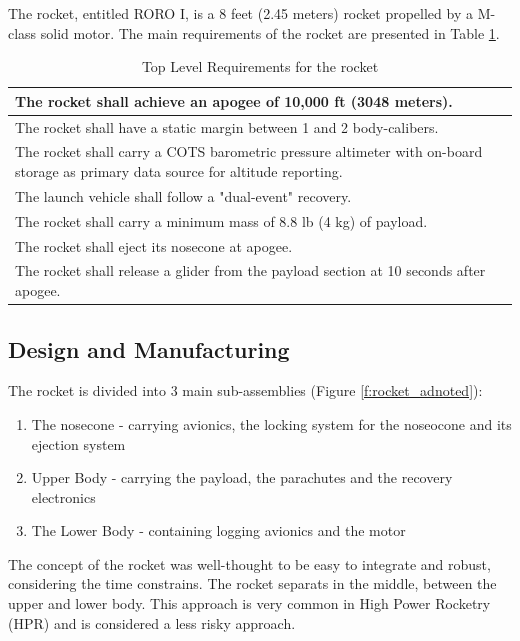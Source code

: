
The rocket, entitled RORO I, is a 8 feet (2.45 meters) rocket propelled by a M-class solid motor. The main requirements of the rocket are presented in Table \ref{table:se_topLevelR}.

\begin{table}[h!]
\centering
\begin{tabular}{|p{}|}
\hline
    The rocket shall achieve an apogee of 10,000 ft (3048 meters).  \\ \hline
    The rocket shall have a static margin between 1 and 2 body-calibers. \\ \hline
    The rocket shall carry a COTS barometric pressure altimeter with on-board storage as primary data source for altitude reporting.  \\ \hline
    The launch vehicle shall follow a "dual-event" recovery. \\ \hline
    The rocket shall carry a minimum mass of 8.8 lb (4 kg) of payload. \\ \hline
    The rocket shall eject its nosecone at apogee. \\ \hline
    The rocket shall release a glider from the payload section at 10 seconds after apogee. \\ \hline

\end{tabular}
\caption{Top Level Requirements for the rocket}
\label{table:se_topLevelR}
\end{table}


\subsection{Design and Manufacturing}


The rocket is divided into 3 main sub-assemblies (Figure \ref{f:rocket_adnoted}):

\begin{enumerate}[noitemsep]
    \item The nosecone - carrying avionics, the locking system for the noseocone and its ejection system
    \item Upper Body - carrying the payload, the parachutes and the recovery electronics
    \item The Lower Body - containing logging avionics and the motor
\end{enumerate}
The concept of the rocket was well-thought to be easy to integrate and robust, considering the time constrains. The rocket separats in the middle, between the upper and lower body. This approach is very common in High Power Rocketry (HPR) and is considered a less risky approach.

